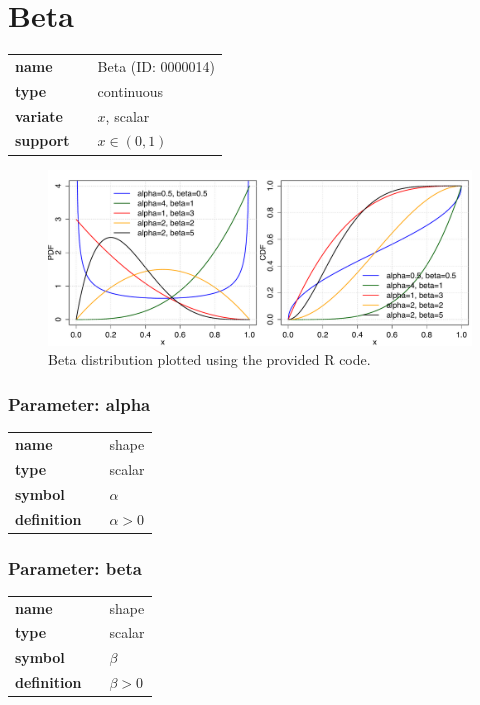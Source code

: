 \section*{Beta} 

  \bigskip 

\begin{tabular}{p{2cm}cl}
\textbf{name} & & Beta (ID: 0000014)\\ 
 
\textbf{type} & & continuous \\ 

\textbf{variate} & & $x$, scalar \\ 

\textbf{support} & & $x \in (0,1)$
\end{tabular}

\begin{figure}[ht!]
\centering
  \includegraphics[width=140mm]{pics/Beta.pdf}
 \caption{Beta distribution plotted using the provided R code.}
 \label{fig:Beta}
\end{figure}

\subsubsection*{Parameter: alpha}

\noindent\begin{tabular}{p{2cm}cl}
\textbf{name} & & shape \\
\textbf{type} & & scalar \\
\textbf{symbol} & & $\alpha$  \\
\textbf{definition} & & $\alpha > 0$
\end{tabular}
\subsubsection*{Parameter: beta}

\noindent\begin{tabular}{p{2cm}cl}
\textbf{name} & & shape \\
\textbf{type} & & scalar \\
\textbf{symbol} & & $\beta$  \\
\textbf{definition} & & $\beta > 0$
\end{tabular}
